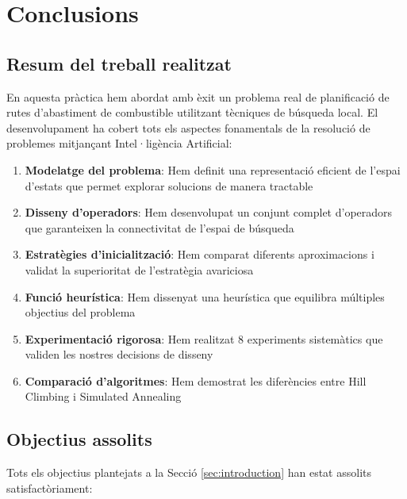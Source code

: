 \section{Conclusions}
\label{sec:conclusions}

\subsection{Resum del treball realitzat}

En aquesta pràctica hem abordat amb èxit un problema real de planificació de rutes d'abastiment de combustible utilitzant tècniques de búsqueda local. El desenvolupament ha cobert tots els aspectes fonamentals de la resolució de problemes mitjançant Intel·ligència Artificial:

\begin{enumerate}
    \item \textbf{Modelatge del problema}: Hem definit una representació eficient de l'espai d'estats que permet explorar solucions de manera tractable
    
    \item \textbf{Disseny d'operadors}: Hem desenvolupat un conjunt complet d'operadors que garanteixen la connectivitat de l'espai de búsqueda
    
    \item \textbf{Estratègies d'inicialització}: Hem comparat diferents aproximacions i validat la superioritat de l'estratègia avariciosa
    
    \item \textbf{Funció heurística}: Hem dissenyat una heurística que equilibra múltiples objectius del problema
    
    \item \textbf{Experimentació rigorosa}: Hem realitzat 8 experiments sistemàtics que validen les nostres decisions de disseny
    
    \item \textbf{Comparació d'algoritmes}: Hem demostrat les diferències entre Hill Climbing i Simulated Annealing
\end{enumerate}

\subsection{Objectius assolits}

Tots els objectius plantejats a la Secció \ref{sec:introduction} han estat assolits satisfactòriament:

